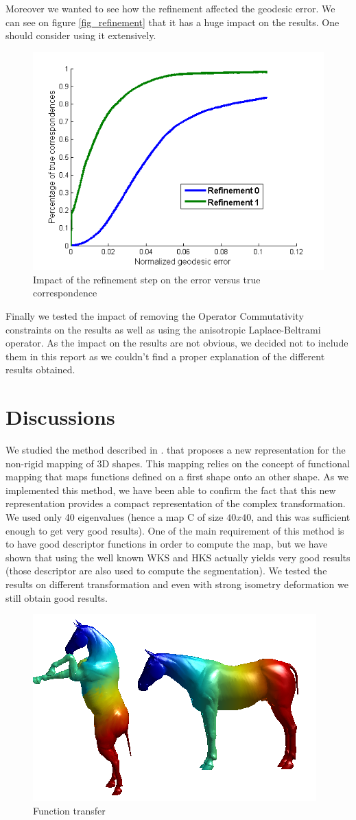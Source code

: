\documentclass[10pt,twocolumn,letterpaper]{article}
\begin{document}
Moreover we wanted to see how the refinement affected the geodesic error. We can see on figure \ref{fig_refinement} that it has a huge impact on the results. One should consider using it extensively.

\begin{figure}[h]
\centering
\includegraphics[width=.4\textwidth]{Images/refinement.png}
\caption{Impact of the refinement step on the error versus true correspondence}
\label{refinement}
\end{figure}

Finally we tested the impact of removing the Operator Commutativity constraints on the results as well as using the anisotropic Laplace-Beltrami operator. As the impact on the results are not obvious, we decided not to include them in this report as we couldn't find a proper explanation of the different results obtained.
 

\section{Discussions} %
We studied the method described in \cite{ovs}. that proposes a new representation for the non-rigid mapping of 3D shapes. This mapping relies on the concept of functional mapping that maps functions defined on a first shape onto an other shape. As we implemented this method, we have been able to confirm the fact that this new representation provides a compact representation of the complex transformation. We used only 40 eigenvalues (hence a map C of size $40x40$, and this was sufficient enough to get very good results). One of the main requirement of this method is to have good descriptor functions in order to compute the map, but we have shown that using the well known WKS and HKS actually yields very good results (those descriptor are also used to compute the segmentation). We tested the results on different transformation and even with strong isometry deformation we still obtain good results.

\begin{figure}[h]
\centering
\includegraphics[width=.4\textwidth]{Images/full-constraints-iso1-3segments-horse.png}
\caption{Function transfer}
\label{refinement}
\end{figure}
\end{document}
